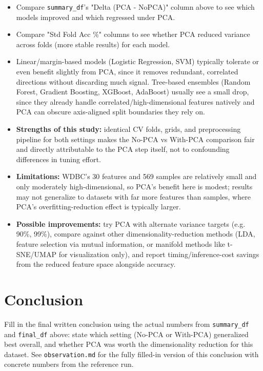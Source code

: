 \documentclass[12pt,a4paper]{article}
\begin{document}
\begin{itemize}
\item Compare \texttt{summary\_df}'s "Delta (PCA - NoPCA)" column above to see which models improved and
which regressed under PCA.
\item Compare "Std Fold Acc \%" columns to see whether PCA reduced variance across folds (more stable
results) for each model.
\item Linear/margin-based models (Logistic Regression, SVM) typically tolerate or even benefit
slightly from PCA, since it removes redundant, correlated directions without discarding much
signal. Tree-based ensembles (Random Forest, Gradient Boosting, XGBoost, AdaBoost) usually see
a small drop, since they already handle correlated/high-dimensional features natively and PCA
can obscure axis-aligned split boundaries they rely on.
\item \textbf{Strengths of this study:} identical CV folds, grids, and preprocessing pipeline for both
settings makes the No-PCA vs With-PCA comparison fair and directly attributable to the PCA step
itself, not to confounding differences in tuning effort.
\item \textbf{Limitations:} WDBC's 30 features and 569 samples are relatively small and only moderately
high-dimensional, so PCA's benefit here is modest; results may not generalize to datasets with
far more features than samples, where PCA's overfitting-reduction effect is typically larger.
\item \textbf{Possible improvements:} try PCA with alternate variance targets (e.g. 90\%, 99\%), compare
against other dimensionality-reduction methods (LDA, feature selection via mutual information,
or manifold methods like t-SNE/UMAP for visualization only), and report timing/inference-cost
savings from the reduced feature space alongside accuracy.
\end{itemize}


\section{Conclusion}
\label{sec:org9c1b672}

Fill in the final written conclusion using the actual numbers from \texttt{summary\_df} and \texttt{final\_df}
above: state which setting (No-PCA or With-PCA) generalized best overall, and whether PCA was
worth the dimensionality reduction for this dataset. See \texttt{observation.md} for the fully filled-in
version of this conclusion with concrete numbers from the reference run.
\end{document}
